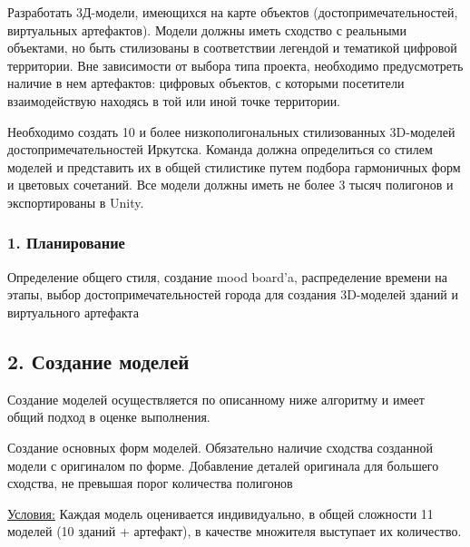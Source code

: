 
Разработать 3Д-модели, имеющихся на карте объектов (достопримечательностей, виртуальных артефактов). Модели должны иметь сходство с реальными объектами, но быть стилизованы в соответствии легендой и тематикой цифровой территории. Вне зависимости от выбора типа проекта, необходимо предусмотреть наличие в нем артефактов: цифровых объектов, с которыми посетители взаимодействую находясь в той или иной точке территории.

Необходимо создать 10 и более низкополигональных стилизованных 3D-моделей достопримечательностей Иркутска. Команда должна определиться со стилем моделей и представить их в общей стилистике путем подбора гармоничных форм и цветовых сочетаний. Все модели должны иметь не более 3 тысяч полигонов и экспортированы в Unity.

\subsubsection*{1. Планирование}

Определение общего стиля, создание mood board'a, распределение времени на этапы, выбор достопримечательностей города для создания 3D-моделей зданий и виртуального артефакта






\subsection*{2. Создание моделей}

Создание моделей осуществляется по описанному ниже алгоритму и имеет общий подход в оценке выполнения.

Создание основных форм моделей. Обязательно наличие сходства созданной модели с оригиналом по форме. Добавление деталей оригинала для большего сходства, не превышая порог количества полигонов



\underline{Условия:} Каждая модель оценивается индивидуально, в общей сложности 11 моделей (10 зданий + артефакт), в качестве множителя выступает их количество.

